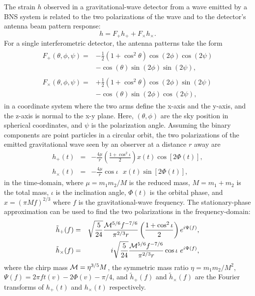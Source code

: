\documentclass[twocolumn,prd,amssymb,aps,nofootinbib,showpacs,epsf]{revtex4}
\begin{document}
The strain $h$ observed in a gravitational-wave detector from a wave emitted by a BNS system is related to the two polarizations of the wave and to the detector's antenna beam pattern response:
\begin{equation}
h=F_+ h_+ + F_\times h_\times.
\end{equation}
For a single interferometric detector, the antenna patterns take the form
\begin{align}
\begin{split}
F_+(\theta,\phi,\psi)=&-\frac{1}{2}(1+\cos^2\theta)\cos(2\phi)\cos(2\psi)\\
&-\cos(\theta)\sin(2\phi)\sin(2\psi),
\end{split}\\
\begin{split}
F_\times(\theta,\phi,\psi)=&+\frac{1}{2}(1+\cos^2\theta)\cos(2\phi)\sin(2\psi)\\
&-\cos(\theta)\sin(2\phi)\cos(2\psi),
\end{split}
\end{align}
in a coordinate system where the two arms define the x-axis and the y-axis, and the z-axis is normal to the x-y plane.  Here, $(\theta, \phi)$ are the sky position in spherical coordinates, and $\psi$ is the polarization angle.  Assuming the binary components are point particles in a circular orbit, the two polarizations of the emitted gravitational wave seen by an observer at a distance $r$ away are
\begin{eqnarray}
\label{hoftp}
h_+(t)&=&-\frac{4\mu}{r}\left(\frac{1+\cos^2\iota}{2}\right)x(t)\cos\left[2\Phi(t)\right],\\
\label{hoftc}
h_\times(t)&=&-\frac{4\mu}{r}\cos\iota\mbox{ }x(t)\sin\left[2\Phi(t)\right],
\end{eqnarray}
in the time-domain, where $\mu=m_1 m_2/M$ is the reduced mass, $M=m_1+m_2$ is the total mass, $\iota$ is the inclination angle, $\Phi(t)$ is the orbital phase, and $x=(\pi M f)^{2/3}$ where $f$ is the gravitational-wave frequency.  The stationary-phase approximation can be used to find the two polarizations in the frequency-domain:
\begin{eqnarray}
\label{hoffp}
\tilde{h}_+(f)&=&\sqrt{\frac{5}{24}}\frac{{\cal M}^{5/6}f^{-7/6}}{\pi^{2/3}r}\left(\frac{1+\cos^2\iota}{2}\right)e^{i\Psi(f)},\\
\label{hoffc}
\tilde{h}_\times(f)&=&i\sqrt{\frac{5}{24}}\frac{{\cal M}^{5/6}f^{-7/6}}{\pi^{2/3}r}\cos\iota\mbox{ }e^{i\Psi(f)},
\end{eqnarray}
where the chirp mass ${\cal M}=\eta^{3/5}M$, the symmetric mass ratio $\eta=m_1 m_2/M^2$, $\Psi(f)=2\pi f t(v) - 2\Phi(v) - \pi/4$, and $\tilde{h}_+(f)$ and $\tilde{h}_\times(f)$ are the Fourier transforms of $h_+(t)$ and $h_\times(t)$ respectively.
\end{document}
